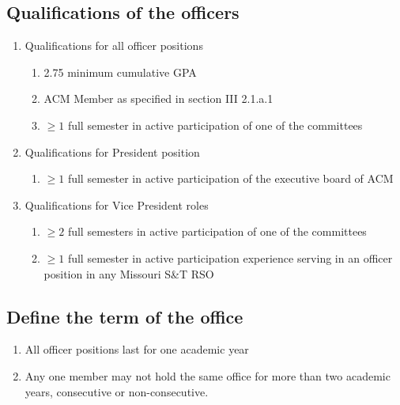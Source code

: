   \subsection{Qualifications of the officers}
    \begin{enumerate}[label=\arabic*.]
      \item Qualifications for all officer positions
        \begin{enumerate}[label=\arabic*.]
          \item 2.75 minimum cumulative GPA
          \item ACM Member as specified in section III 2.1.a.1
          \item $\geq{1}$ full semester in active participation of one of the committees
        \end{enumerate}
      \item Qualifications for President position
        \begin{enumerate}[label=\arabic*.]
          \item $\geq{1}$ full semester in active participation of the executive board of ACM
        \end{enumerate}
      \item Qualifications for Vice President roles
        \begin{enumerate}[label=\arabic*.]
          \item $\geq{2}$ full semesters in active participation of one of the committees
          \item $\geq{1}$ full semester in active participation experience serving in an officer position in
          any Missouri S\&T RSO
        \end{enumerate}
    \end{enumerate}
 
  \subsection{Define the term of the office}
    \begin{enumerate}[label=\arabic*.]
      \item All officer positions last for one academic year
      \item Any one member may not hold the same office for more than two
      academic years, consecutive or non-consecutive.
    \end{enumerate}
